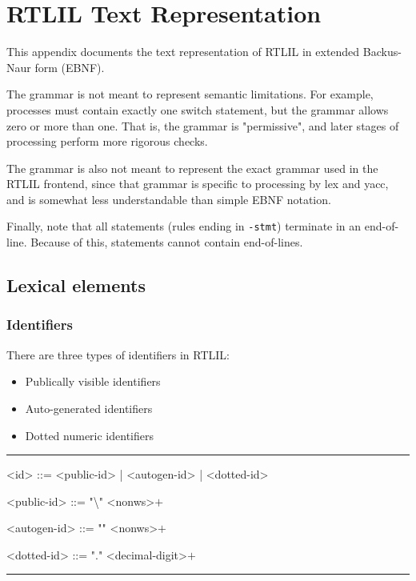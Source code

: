 \chapter{RTLIL Text Representation}
\label{chapter:textrtlil}

\newlength{\myl}

\newenvironment{indentgrammar}[1]
    {\vspace{0.5cm}\hrule
    \setlength{\myl}{\widthof{#1}+2em}
    \grammarindent\the\myl
    \begin{grammar}}
    {\end{grammar}
    \hrule}

This appendix documents the text representation of RTLIL in extended Backus-Naur form (EBNF).

The grammar is not meant to represent semantic limitations. For example, processes must contain exactly one switch statement, but the grammar allows zero or more than one. That is, the grammar is "permissive", and later stages of processing perform more rigorous checks.

The grammar is also not meant to represent the exact grammar used in the RTLIL frontend, since that grammar is specific to processing by lex and yacc, and is somewhat less understandable than simple EBNF notation.

Finally, note that all statements (rules ending in \texttt{-stmt}) terminate in an end-of-line. Because of this, statements cannot contain end-of-lines.

\section{Lexical elements}

\subsection{Identifiers}

There are three types of identifiers in RTLIL:

\begin{itemize}
    \item Publically visible identifiers
    \item Auto-generated identifiers
    \item Dotted numeric identifiers
\end{itemize}

\begin{indentgrammar}{<autogen-id>}
<id> ::= <public-id> | <autogen-id> | <dotted-id>

<public-id> ::= "\textbackslash" <nonws>$+$

<autogen-id> ::= "\textdollar" <nonws>$+$

<dotted-id> ::= "." <decimal-digit>$+$
\end{indentgrammar}

